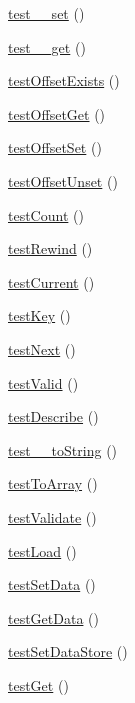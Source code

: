\begin{DoxyCompactItemize}
\item 
\hyperlink{class_model_test_a133961fce7b0448ad9ee6f1bb73e003d}{test\_\-\_\-set} ()
\item 
\hyperlink{class_model_test_a85e1e87b00e8dadaaf79e240afe94e0e}{test\_\-\_\-get} ()
\item 
\hyperlink{class_model_test_a87952d04b9bdc7e0f5fcd9da8e201760}{testOffsetExists} ()
\item 
\hyperlink{class_model_test_a8671622e18228634c4b92a021a549f3f}{testOffsetGet} ()
\item 
\hyperlink{class_model_test_a80c4fcb75363c587a1b70a15fb065a4a}{testOffsetSet} ()
\item 
\hyperlink{class_model_test_ad33b8f575918aaededdde2a60aaca8fc}{testOffsetUnset} ()
\item 
\hyperlink{class_model_test_a070ecd158e74eb09b5542e278c6be02e}{testCount} ()
\item 
\hyperlink{class_model_test_ab933d1bfe4a1ff3a6d510a15baf981f2}{testRewind} ()
\item 
\hyperlink{class_model_test_a9701d33435747833b4405348dffa10c1}{testCurrent} ()
\item 
\hyperlink{class_model_test_a7bcdc5760ebda4e67d9025a4abfaf384}{testKey} ()
\item 
\hyperlink{class_model_test_a4a9f44e360f4044dc2e110ab22b55f75}{testNext} ()
\item 
\hyperlink{class_model_test_a3b684ddeb500dfdbd105eb9d8c27c281}{testValid} ()
\item 
\hyperlink{class_model_test_a64d7612b36c32be5c1021f1c4e919241}{testDescribe} ()
\item 
\hyperlink{class_model_test_a115e29f53377ca5ffc0091ced03ac3fa}{test\_\-\_\-toString} ()
\item 
\hyperlink{class_model_test_a78c75cab348c31c08d801eeeebcfb30b}{testToArray} ()
\item 
\hyperlink{class_model_test_acdfbdc2dbaaea9c9eeb65e432e3cc998}{testValidate} ()
\item 
\hyperlink{class_model_test_a112b5d8306fc68b542b5bc1b308a054d}{testLoad} ()
\item 
\hyperlink{class_model_test_af5bcc488e594c6cb77b7c27269fa1624}{testSetData} ()
\item 
\hyperlink{class_model_test_a224270719543e6a640f157744ae61d2a}{testGetData} ()
\item 
\hyperlink{class_model_test_a076bdaf3c6eddc312332f4f412b8ccf8}{testSetDataStore} ()
\item 
\hyperlink{class_model_test_aadc395097a679d2a80eaa2a9e114ecb1}{testGet} ()

\end{DoxyCompactItemize}
